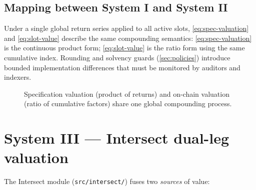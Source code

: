\documentclass[11pt,a4paper]{article}
\begin{document}
\subsection{Mapping between System I and System II}

Under a single global return series applied to all active slots, \eqref{eq:spec-valuation} and
\eqref{eq:slot-value} describe the same compounding semantics: \eqref{eq:spec-valuation} is the
continuous product form; \eqref{eq:slot-value} is the ratio form using the same cumulative index.
Rounding and solvency guards (\cref{sec:policies}) introduce bounded implementation differences that
must be monitored by auditors and indexers.

\begin{figure}[htbp]
\centering
{}
\caption{Specification valuation (product of returns) and on-chain valuation (ratio of cumulative
factors) share one global compounding process.}
\label{fig:spec-chain}
\end{figure}

\section{System III --- Intersect dual-leg valuation}
\label{sec:intersect}

The Intersect module (\texttt{src/intersect/}) fuses two \emph{sources} of value:
\end{document}
